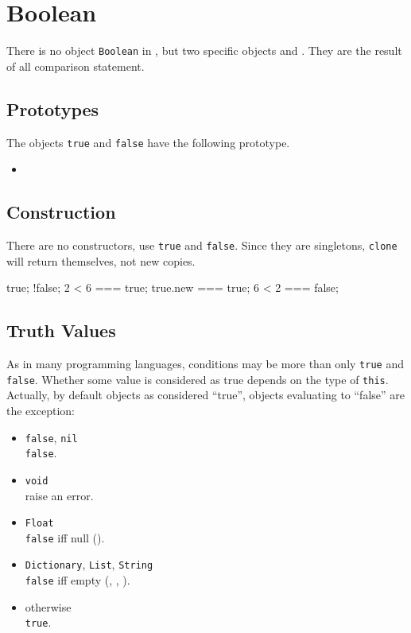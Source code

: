 \section{Boolean}

There is no object \lstinline|Boolean| in \us, but two specific
objects  and .  They are the result of
all comparison statement.


\subsection{Prototypes}

The objects \lstinline|true| and \lstinline|false| have the following
prototype.

\begin{itemize}
\item {}
\end{itemize}

\subsection{Construction}

There are no constructors, use \lstinline|true| and \lstinline|false|.
Since they are singletons, \lstinline|clone| will return themselves,
not new copies.

\begin{urbiassert}[firstnumber=1]
true;
!false;
2 < 6 === true;
true.new === true;
6 < 2 === false;
\end{urbiassert}

\subsection{Truth Values}
\label{sec:truth}

As in many programming languages, conditions may be more than only
\lstinline|true| and \lstinline|false|.  Whether some value is
considered as true depends on the type of \lstinline|this|.  Actually,
by default objects as considered ``true'', objects evaluating to
``false'' are the exception:
\begin{itemize}
\item \lstinline|false|, \lstinline|nil|\\
  \lstinline|false|.
\item \lstinline|void|\\
  raise an error.
\item \lstinline|Float|\\
  \lstinline|false| iff null ().
\item \lstinline|Dictionary|, \lstinline|List|,  \lstinline|String|\\
  \lstinline|false| iff empty (,
  , ).
\item otherwise\\
  \lstinline|true|.
\end{itemize}

